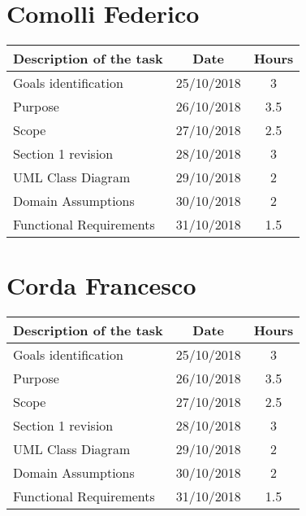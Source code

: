 \section{Comolli Federico}
\begin{center}
\begin{tabular}{l c c}
{\bf Description of the task}&{\bf Date}&{\bf Hours}\\ \hline
Goals identification & {25/10/2018} & {3} \\ \hline
Purpose & {26/10/2018} & {3.5} \\ \hline
Scope & {27/10/2018} & {2.5} \\ \hline
Section 1 revision & {28/10/2018} & {3} \\ \hline
UML Class Diagram & {29/10/2018} & {2} \\ \hline
Domain Assumptions & {30/10/2018} & {2} \\ \hline
Functional Requirements & {31/10/2018} & {1.5} \\ \hline
\end{tabular}
\end{center}

\section{Corda Francesco}
\begin{center}
\begin{tabular}{l c c}
{\bf Description of the task}&{\bf Date}&{\bf Hours}\\ \hline
Goals identification & {25/10/2018} & {3} \\ \hline
Purpose & {26/10/2018} & {3.5} \\ \hline
Scope & {27/10/2018} & {2.5} \\ \hline
Section 1 revision & {28/10/2018} & {3} \\ \hline
UML Class Diagram & {29/10/2018} & {2} \\ \hline
Domain Assumptions & {30/10/2018} & {2} \\ \hline
Functional Requirements & {31/10/2018} & {1.5} \\ \hline
\end{tabular}
\end{center}